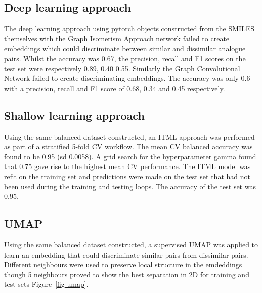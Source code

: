 \documentclass[
  super,
  preprint,
  3p]{elsarticle}
\begin{document}
\subsection{Deep learning approach}\label{deep-learning-approach}

The deep learning approach using pytorch objects constructed from the
SMILES themselves with the Graph Isomerism Approach network failed to
create embeddings which could discriminate between similar and
dissimilar analogue pairs. Whilst the accuracy was 0.67, the precision,
recall and F1 scores on the test set were respectively 0.89, 0.40 0.55.
Similarly the Graph Convolutional Network failed to create
discriminating embeddings. The accuracy was only 0.6 with a precision,
recall and F1 score of 0.68, 0.34 and 0.45 respectively.

\subsection{Shallow learning approach}\label{shallow-learning-approach}

Using the same balanced dataset constructed, an ITML approach was
performed as part of a stratified 5-fold CV workflow. The mean CV
balanced accuracy was found to be 0.95 (sd 0.0058). A grid search for
the hyperparameter gamma found that 0.75 gave rise to the highest mean
CV performance. The ITML model was refit on the training set and
predictions were made on the test set that had not been used during the
training and testing loops. The accuracy of the test set was 0.95.

\subsection{UMAP}\label{umap-1}

Using the same balanced dataset constructed, a supervised UMAP was
applied to learn an embedding that could discriminate similar pairs from
dissimilar pairs. Different neighbours were used to preserve local
structure in the emdeddings though 5 neighbours proved to show the best
separation in 2D for training and test sets Figure~\ref{fig-umap}.
\end{document}
